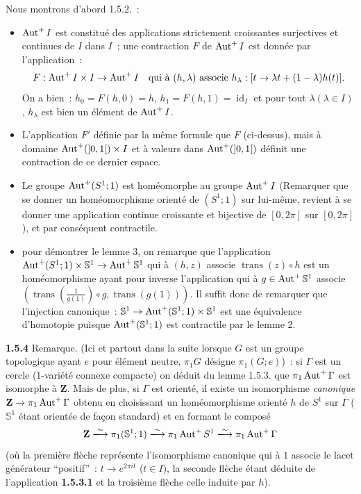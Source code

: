 Nous montrons d'abord 1.5.2.~:
\begin{itemize}
    \item[$1^{\circ}$)] $\operatorname{Aut}^+ I$ est constitué des applications strictement croissantes surjectives et continues de $I$ dans $I$~; une contraction $F$ de $\operatorname{Aut}^+ I$ est donnée par l'application~:
    \[
    F : \operatorname{Aut}^+ I \times I \rightarrow \operatorname{Aut}^+ I \quad \text{qui à } (h,\lambda) \text{ associe } h_{\lambda} : [t \rightarrow \lambda t + (1-\lambda)h(t)].
    \]
    On a bien~: $h_0 = F(h,0) = h$, $h_1 = F(h,1) = \operatorname{id}_I$ et pour tout $\lambda (\lambda \in I)$, $h_{\lambda}$ est bien un élément de $\operatorname{Aut}^+ I$.
    \item[$2^{\circ}$)] L'application $F'$ définie par la même formule que $F$ (ci-dessus), mais à domaine $\operatorname{Aut}^+(]0,1[) \times I$ et à valeurs dans $\operatorname{Aut}^+(]0,1[)$ définit une contraction de ce dernier espace.
    \item[$3^{\circ}$)] Le groupe $\operatorname{Aut}^+(S^1 ; 1)$ est homéomorphe au groupe $\operatorname{Aut}^+ I$ (Remarquer que se donner un homéomorphisme orienté de $(S^1 ; 1)$ sur lui-même, revient à se donner une application continue croissante et bijective de $[0,2\pi]$ sur $[0,2\pi]$), et par conséquent contractile.
    \item[$4^{\circ}$)] pour démontrer le lemme 3, on remarque que l'application $\operatorname{Aut}^+(S^1 ; 1) \times \mathbb{S}^1 \to \operatorname{Aut}^+ \mathbb{S}^1$ qui à $(h,z)$ associe $\operatorname{trans}(z) \circ h$ est un homéomorphisme ayant pour inverse l'application qui à $g \in \operatorname{Aut}^+ \mathbb{S}^1$ associe $(\operatorname{trans}(\frac{1}{g(1)}) \circ g, \operatorname{trans}(g(1)))$. Il suffit donc de remarquer que l'injection canonique~: $\mathbb{S}^1 \to \operatorname{Aut}^+(\mathbb{S}^1 ; 1) \times \mathbb{S}^1$ est une équivalence d'homotopie puisque $\operatorname{Aut}^+(\mathbb{S}^1 ; 1)$ est contractile par le lemme 2.
\end{itemize}

{\bf 1.5.4} Remarque. (Ici et partout dans la suite lorsque $G$ est un groupe topologique ayant $e$ pour élément neutre, $\pi_1 G$ désigne $\pi_1(G ; e)$)~:
si $\Gamma$ est un cercle (1-variété connexe compacte) on déduit du lemme 1.5.3. que $\pi_1 \operatorname{Aut}^+ \Gamma$ est isomorphe à $\mathbf{Z}$. Mais de plus, si $\Gamma$ est orienté, il existe un isomorphisme \emph{canonique} $\mathbf{Z} \to \pi_1 \operatorname{Aut}^+ \Gamma$ obtenu en choisissant un homéomorphisme orienté $h$ de $S^1$ sur $\Gamma$ ($\mathbb{S}^1$ étant orientée de façon standard) et en formant le composé
\[
\mathbf{Z} \isommap \pi_1(\mathbb{S}^1 ; 1) \isommap \pi_1 \Aut^+ S^1 \isommap \pi_1 \Aut^+ \Gamma
\]
(où la première flèche représente l'isomorphisme canonique qui à $1$ associe le lacet générateur ``positif''~: $t \to e^{2\pi i t}$ ($t \in I$), la seconde flèche étant déduite de l'application {\bf 1.5.3.1} et la troisième flèche celle induite par $h$).

